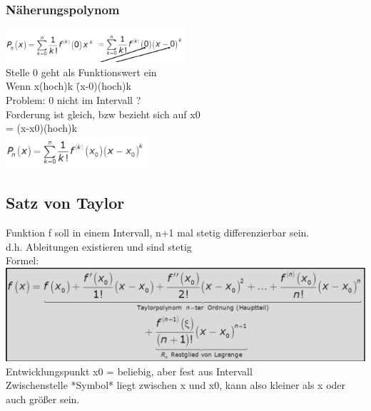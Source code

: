 \documentclass[12pt,a4paper]{article}
\begin{document}
\subsubsection{Näherungspolynom}
\includegraphics[width=0.5\textwidth]{BIlder/V1/6.png}\\
Stelle 0 geht als Funktionswert ein\\
Wenn x(hoch)k \= (x-0)(hoch)k\\
Problem: 0 nicht im Intervall ?\\
Forderung ist gleich, bzw bezieht sich auf x0\\
= (x-x0)(hoch)k\\
\includegraphics[width=0.4\textwidth]{BIlder/V1/7.png}

\subsection{Satz von Taylor}
Funktion f soll in einem Intervall, n+1 mal stetig differenzierbar sein.\\
d.h. Ableitungen existieren und sind stetig\\
Formel:\\
\includegraphics[width=1\textwidth]{BIlder/V1/8.png}\\
Entwicklungspunkt x0 = beliebig, aber fest aus Intervall\\
Zwischenstelle *Symbol* liegt zwischen x und x0, kann also kleiner als x oder auch größer sein.\\
\end{document}
